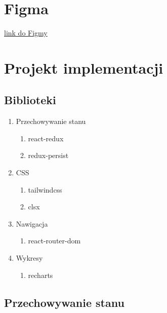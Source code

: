 \documentclass[a4paper,11pt]{article}
\begin{document}
\section{Figma}
\href{https://www.figma.com/file/fKp84G0oZXkCUW8J8Bf94M/PGUI-Panel-Sprzedawcy?node-id=303%3A40&t=JpyKh5oAmRAebYLE-0}{link do Figmy}
\section{Projekt implementacji}
\subsection{Biblioteki}
\begin{enumerate}
    \item Przechowywanie stanu
    \begin{enumerate}
        \item react-redux
        \item redux-persist
    \end{enumerate}
    \item CSS
    \begin{enumerate}
        \item tailwindcss
        \item clsx
    \end{enumerate}
    \item Nawigacja
    \begin{enumerate}
        \item react-router-dom
    \end{enumerate}
    \item Wykresy
    \begin{enumerate}
        \item recharts
    \end{enumerate}
\end{enumerate}
\subsection{Przechowywanie stanu}
\end{document}
